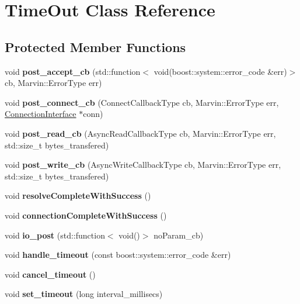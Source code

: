 \hypertarget{class_time_out}{}\section{Time\+Out Class Reference}
\label{class_time_out}
\subsection*{Protected Member Functions}
\begin{DoxyCompactItemize}
\item 
\mbox{\label{class_time_out_ae5f0cd1426fe1ac9ba40183ba3082705}} 
void {\bfseries post\+\_\+accept\+\_\+cb} (std\+::function$<$ void(boost\+::system\+::error\+\_\+code \&err)$>$ cb, Marvin\+::\+Error\+Type err)
\item 
\mbox{\label{class_time_out_aeec4b12819e3444fbd1c02a7febaddfb}} 
void {\bfseries post\+\_\+connect\+\_\+cb} (Connect\+Callback\+Type cb, Marvin\+::\+Error\+Type err, \hyperlink{class_connection_interface}{Connection\+Interface} $\ast$conn)
\item 
\mbox{\label{class_time_out_a3a34768add85d71eb325c034e6b1607a}} 
void {\bfseries post\+\_\+read\+\_\+cb} (Async\+Read\+Callback\+Type cb, Marvin\+::\+Error\+Type err, std\+::size\+\_\+t bytes\+\_\+transfered)
\item 
\mbox{\label{class_time_out_ad1da52dc325acfb62dfe4e601c5778e7}} 
void {\bfseries post\+\_\+write\+\_\+cb} (Async\+Write\+Callback\+Type cb, Marvin\+::\+Error\+Type err, std\+::size\+\_\+t bytes\+\_\+transfered)
\item 
\mbox{\label{class_time_out_ad41f3f6ca33f4ab63524c29701f5ec9a}} 
void {\bfseries resolve\+Complete\+With\+Success} ()
\item 
\mbox{\label{class_time_out_a58783f20a862ab5da3adc924041c0c26}} 
void {\bfseries connection\+Complete\+With\+Success} ()
\item 
\mbox{\label{class_time_out_ae679c067151526552649a808ed49bc02}} 
void {\bfseries io\+\_\+post} (std\+::function$<$ void()$>$ no\+Param\+\_\+cb)
\item 
\mbox{\label{class_time_out_a3b839e403e972b9caf870175a6e55922}} 
void {\bfseries handle\+\_\+timeout} (const boost\+::system\+::error\+\_\+code \&err)
\item 
\mbox{\label{class_time_out_afdb132b97df4cf2fc925ef5e7fa6ce64}} 
void {\bfseries cancel\+\_\+timeout} ()
\item 
\mbox{\label{class_time_out_a3472c813f33f2bdf656624b9b7911ecb}} 
void {\bfseries set\+\_\+timeout} (long interval\+\_\+millisecs)
\end{DoxyCompactItemize}
